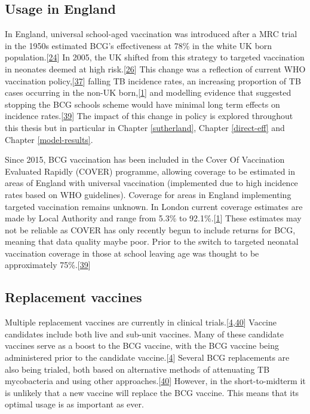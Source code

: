 \documentclass[11pt,twoside]{bristolthesis}
\begin{document}
  \hypertarget{usage-in-england}{%
  \subsection{Usage in England}\label{usage-in-england}}
  
  In England, universal school-aged vaccination was introduced after a MRC trial in the 1950s estimated BCG's effectiveness at 78\% in the white UK born population.{[}\protect\hyperlink{ref-Hart1972}{24}{]} In 2005, the UK shifted from this strategy to targeted vaccination in neonates deemed at high risk.{[}\protect\hyperlink{ref-Abubakar2013}{26}{]} This change was a reflection of current WHO vaccination policy,{[}\protect\hyperlink{ref-WHO2017}{37}{]} falling TB incidence rates, an increasing proportion of TB cases occurring in the non-UK born,{[}\protect\hyperlink{ref-PHE2017}{1}{]} and modelling evidence that suggested stopping the BCG schools scheme would have minimal long term effects on incidence rates.{[}\protect\hyperlink{ref-Sutherland1989}{39}{]} The impact of this change in policy is explored throughout this thesis but in particular in Chapter \ref{sutherland}, Chapter \ref{direct-eff} and Chapter \ref{model-results}.
  
  Since 2015, BCG vaccination has been included in the Cover Of Vaccination Evaluated Rapidly (COVER) programme, allowing coverage to be estimated in areas of England with universal vaccination (implemented due to high incidence rates based on WHO guidelines). Coverage for areas in England implementing targeted vaccination remains unknown. In London current coverage estimates are made by Local Authority and range from 5.3\% to 92.1\%.{[}\protect\hyperlink{ref-PHE2017}{1}{]} These estimates may not be reliable as COVER has only recently begun to include returns for BCG, meaning that data quality maybe poor. Prior to the switch to targeted neonatal vaccination coverage in those at school leaving age was thought to be approximately 75\%.{[}\protect\hyperlink{ref-Sutherland1989}{39}{]}
  
  \hypertarget{replacement-vaccines}{%
  \subsection{Replacement vaccines}\label{replacement-vaccines}}
  
  Multiple replacement vaccines are currently in clinical trials.{[}\protect\hyperlink{ref-Zwerling2011a}{4},\protect\hyperlink{ref-Schrager:2018ip}{40}{]} Vaccine candidates include both live and sub-unit vaccines. Many of these candidate vaccines serve as a boost to the BCG vaccine, with the BCG vaccine being administered prior to the candidate vaccine.{[}\protect\hyperlink{ref-Zwerling2011a}{4}{]} Several BCG replacements are also being trialed, both based on alternative methods of attenuating TB mycobacteria and using other approaches.{[}\protect\hyperlink{ref-Schrager:2018ip}{40}{]} However, in the short-to-midterm it is unlikely that a new vaccine will replace the BCG vaccine. This means that its optimal usage is as important as ever.
  
\end{document}
